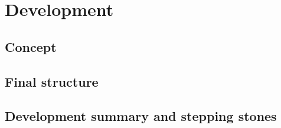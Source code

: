 
\chapter{Development}\label{chapter:development}

\section{Concept}
\section{Final structure}
\section{Development summary and stepping stones}